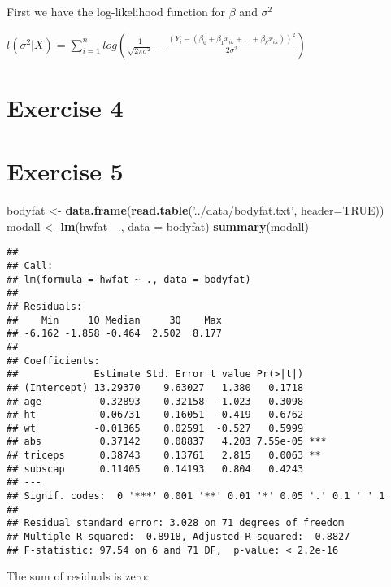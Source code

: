 \documentclass[]{article}
\newenvironment{Shaded}{\begin{snugshade}}{\end{snugshade}}
\newcommand{\DataTypeTok}[1]{\textcolor[rgb]{0.13,0.29,0.53}{#1}}
\newcommand{\KeywordTok}[1]{\textcolor[rgb]{0.13,0.29,0.53}{\textbf{#1}}}
\newcommand{\NormalTok}[1]{#1}
\newcommand{\OperatorTok}[1]{\textcolor[rgb]{0.81,0.36,0.00}{\textbf{#1}}}
\newcommand{\OtherTok}[1]{\textcolor[rgb]{0.56,0.35,0.01}{#1}}
\newcommand{\StringTok}[1]{\textcolor[rgb]{0.31,0.60,0.02}{#1}}
\begin{document}
First we have the log-likelihood function for \(\beta\) and
\(\sigma^{2}\)

\(l(\sigma^{2} | X) = \sum_{i=1}^n log(\frac{1}{\sqrt{2 \pi \sigma^{2}}} - \frac{(Y_{i} - (\beta_{0} + \beta_{1} x_{ik} + \dots + \beta_{k} x_{ik}))^{2}}{2 \sigma^{2}})\)

\hypertarget{exercise-4}{%
\section{Exercise 4}\label{exercise-4}}

\hypertarget{exercise-5}{%
\section{Exercise 5}\label{exercise-5}}

\begin{Shaded}
\begin{Highlighting}[]
\NormalTok{bodyfat <-}\StringTok{ }\KeywordTok{data.frame}\NormalTok{(}\KeywordTok{read.table}\NormalTok{(}\StringTok{'../data/bodyfat.txt'}\NormalTok{, }\DataTypeTok{header=}\OtherTok{TRUE}\NormalTok{))}
\NormalTok{modall <-}\StringTok{ }\KeywordTok{lm}\NormalTok{(hwfat }\OperatorTok{~}\NormalTok{., }\DataTypeTok{data =}\NormalTok{ bodyfat)}
\KeywordTok{summary}\NormalTok{(modall)}
\end{Highlighting}
\end{Shaded}

\begin{verbatim}
## 
## Call:
## lm(formula = hwfat ~ ., data = bodyfat)
## 
## Residuals:
##    Min     1Q Median     3Q    Max 
## -6.162 -1.858 -0.464  2.502  8.177 
## 
## Coefficients:
##             Estimate Std. Error t value Pr(>|t|)    
## (Intercept) 13.29370    9.63027   1.380   0.1718    
## age         -0.32893    0.32158  -1.023   0.3098    
## ht          -0.06731    0.16051  -0.419   0.6762    
## wt          -0.01365    0.02591  -0.527   0.5999    
## abs          0.37142    0.08837   4.203 7.55e-05 ***
## triceps      0.38743    0.13761   2.815   0.0063 ** 
## subscap      0.11405    0.14193   0.804   0.4243    
## ---
## Signif. codes:  0 '***' 0.001 '**' 0.01 '*' 0.05 '.' 0.1 ' ' 1
## 
## Residual standard error: 3.028 on 71 degrees of freedom
## Multiple R-squared:  0.8918, Adjusted R-squared:  0.8827 
## F-statistic: 97.54 on 6 and 71 DF,  p-value: < 2.2e-16
\end{verbatim}

The sum of residuals is zero:
\end{document}

